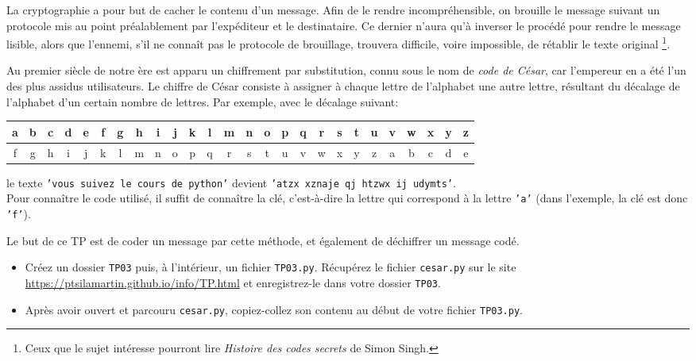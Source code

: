 \documentclass[t,11pt,eleve]{article}
\newcommand{\site}{\textbf{ENT/Moodle/cours"infoPTSI"}}
\begin{document}
\entetetpinfo



La cryptographie a pour but de cacher le contenu d'un message. Afin de le rendre incompréhensible, on brouille le message suivant un protocole mis au point préalablement par l'expéditeur et le destinataire. Ce dernier n'aura qu'à inverser le procédé pour rendre le message lisible, alors que l'ennemi, s'il ne connaît pas le protocole de brouillage, trouvera difficile, voire impossible, de rétablir le texte original \footnote{Ceux que le sujet intéresse pourront lire \emph{Histoire des codes secrets} de Simon Singh.}. 

Au premier siècle de notre ère est apparu un chiffrement par substitution, connu sous le nom de \emph{code de César}, car l'empereur en a été l'un des plus assidus utilisateurs. Le chiffre de César consiste à assigner à chaque lettre de l'alphabet une autre lettre, résultant du décalage de l'alphabet d'un certain nombre de lettres. Par exemple, avec le décalage suivant:
\begin{center}
\begin{tabular}{|*{26}{c|}}
\hline
a&b&c&d&e&f&g&h&i&j&k&l&m&n&o&p&q&r&s&t&u&v&w&x&y&z\\
\hline
f&g&h&i&j&k&l&m&n&o&p&q&r&s&t&u&v&w&x&y&z&a&b&c&d&e\\
\hline
\end{tabular}
\end{center}
le texte \texttt{'vous suivez le cours de python'} devient \texttt{'atzx xznaje qj htzwx ij udymts'}.\\ Pour connaître le code utilisé, il suffit de connaître la clé, c'est-à-dire la lettre qui correspond à la lettre \texttt{'a'} (dans l'exemple, la clé est donc \texttt{'f'}). 
\bigskip

Le but de ce TP est de coder un message par cette méthode, et également de déchiffrer un message codé. 
\bigskip
\begin{itemize}
\item[\textbullet] Créez un dossier \texttt{TP03} puis, à l'intérieur, un fichier \texttt{TP03.py}. 
Récupérez  le fichier \texttt{cesar.py} sur le site \url{https://ptsilamartin.github.io/info/TP.html}  et enregistrez-le dans votre dossier \texttt{TP03}.
\item[\textbullet] Après avoir ouvert et parcouru \texttt{cesar.py}, copiez-collez son contenu au début de votre fichier \texttt{TP03.py}.
\end{itemize}

\bigskip
%
\end{document}

